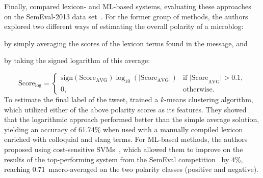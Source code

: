 Finally, \citet{Kolchyna:15} compared lexicon- and ML-based systems,
evaluating these approaches on the SemEval-2013 data
set~\cite{Nakov:13}.  For the former group of methods, the authors
explored two different ways of estimating the overall polarity of a
microblog:
\begin{inparaenum}[(i)]
\item by simply averaging the scores of the lexicon terms found in the
  message, and
\item by taking the signed logarithm of this average:
\end{inparaenum}
\begin{equation*}
  \text{Score}_{\log} =
  \begin{cases}
    \text{sign}(\text{Score}_{\text{AVG}})\log_{10}(|\text{Score}_{\text{AVG}}|) & %
    \text{if |Score}_{\text{AVG}}| > 0.1,\\
    0, & \text{otherwise}.
  \end{cases}
\end{equation*}%
To estimate the final label of the tweet, \citeauthor{Kolchyna:15}
trained a $k$-means clustering algorithm, which utilized either of the
above polarity scores as its features.  They showed that the
logarithmic approach performed better than the simple average
solution, yielding an accuracy of 61.74\% when used with a manually
compiled lexicon enriched with colloquial and slang terms.  For
ML-based methods, the authors proposed using cost-sensitive
SVMs~\cite{Masnadi:12}, which allowed them to improve on the results
of the top-performing system from the SemEval
competition~\cite{Mohammad:13} by 4\%, reaching 0.71~macro-averaged
\F{} on the two polarity classes (positive and negative).


